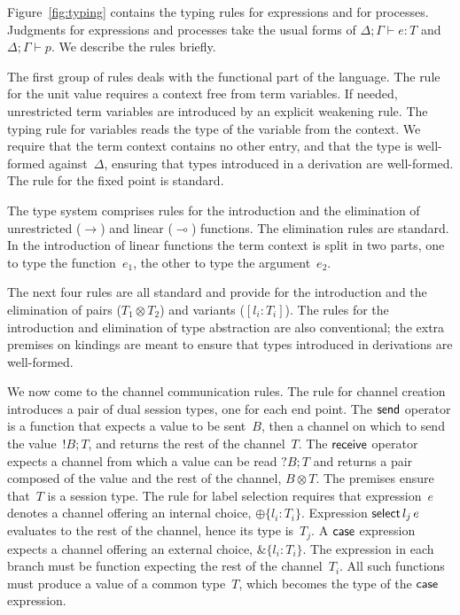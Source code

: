 


Figure~\ref{fig:typing} contains the typing rules for expressions and for
processes. Judgments for expressions and processes take the usual forms of
$\Delta;\Gamma \vdash e: T$ and 
$\Delta;\Gamma \vdash p$. We describe the rules briefly.


The first group of rules deals with the functional part of
the language. The rule for the unit value requires a context
free from term variables. If needed, unrestricted term variables are
introduced by an explicit weakening rule. The typing rule for variables
reads the type of the variable from the context. We require that
the term context contains no other entry, and that the type is
well-formed against~$\Delta$, ensuring that types introduced in a
derivation are well-formed. The rule for the fixed point is standard.

The type system comprises rules for the introduction and the
elimination of unrestricted ($\rightarrow$) and linear ($\multimap$)
functions.
%
The elimination rules are standard. In the introduction of linear
functions the term context is split in two parts, one to type the
function~$e_1$, the other to type the argument~$e_2$.
%

The next four rules are all standard and provide for the
introduction and the elimination of pairs ($T_1\otimes T_2$) and
variants ($[l_i\colon T_i]$).
%
The rules for the introduction and elimination of type abstraction are
also conventional; the extra premises on kindings are meant to ensure
that types introduced in derivations are well-formed.

We now come to the channel communication rules. The rule for channel
creation introduces a pair of dual session types, one for each end
point. The $\mathsf{send}$ operator is a function that expects a value to be
sent~$B$, then a channel on which to send the value~$!B;T$, and
returns the rest of the channel~$T$. The $\mathsf{receive}$ operator expects a
channel from which a value can be read $?B;T$ and returns a pair
composed of the value and the rest of the channel, $B\otimes T$. The
premises ensure that~$T$ is a session type.
%
The rule for label selection requires that expression~$e$ denotes a
channel offering an internal choice, $\oplus\{l_i\colon
T_i\}$.
Expression $\mathsf{select}{\,{l_j}\,{e}}$ evaluates to the rest of the channel,
hence its type is~$T_j$.
%
A $\mathsf{case}$ expression expects a channel offering an external choice,
$\&\{l_i\colon T_i\}$. The expression in each branch must be function
expecting the rest of the channel~$T_i$. All such functions must
produce a value of a common type~$T$, which becomes the type of the
$\mathsf{case}$ expression.

